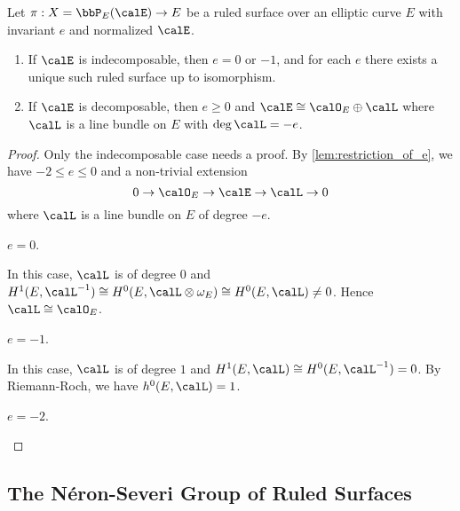     \begin{theorem}\label{thm:classification_of_ruled_surface_on_elliptic_curve}
        Let \(\pi:X = \bbP_E(\calE) \to E\) be a ruled surface over an elliptic curve \(E\) with invariant \(e\) and normalized \(\calE\). 
        \begin{enumerate}
            \item If \(\calE\) is indecomposable, then \(e = 0\) or \(-1\), and for each \(e\) there exists a unique such ruled surface up to isomorphism.
            \item If \(\calE\) is decomposable, then \(e \geq 0\) and \(\calE \cong \calO_E \oplus \calL\) where \(\calL\) is a line bundle on \(E\) with \(\deg \calL = -e\).
        \end{enumerate}
    \end{theorem}
    \begin{proof}
        Only the indecomposable case needs a proof.
        By \cref{lem:restriction_of_e}, we have \(-2 \leq e \leq 0\) and a non-trivial extension
        \[ 0 \to \calO_E \to \calE \to \calL \to 0 \]
        where \(\calL\) is a line bundle on \(E\) of degree \(-e\).
        \begin{case}
            \(e=0\).
        \end{case}
        In this case, \(\calL\) is of degree \(0\) and \(H^1(E,\calL^{-1}) \cong H^0(E,\calL \otimes \omega_E) \cong H^0(E,\calL) \neq 0\).
        Hence \(\calL \cong \calO_E\).

        \begin{case}
            \(e=-1\).
        \end{case}
        In this case, \(\calL\) is of degree \(1\) and \(H^1(E,\calL) \cong H^0(E,\calL^{-1}) = 0\).
        By Riemann-Roch, we have \(h^0(E,\calL) = 1\).

        \begin{case}
            \(e=-2\).
        \end{case}


    \end{proof}

    \begin{example}
    \end{example}


\subsection{The N\'eron-Severi Group of Ruled Surfaces}

